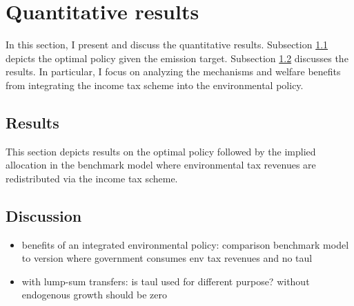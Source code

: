 \section{Quantitative results}\label{sec:res}

In this section, I present and discuss the quantitative results.
Subsection \ref{subsec:mr} depicts the optimal policy given the emission target. Subsection \ref{subsec:dis} discusses the results. In particular, I focus on analyzing the mechanisms and welfare benefits from integrating the income tax scheme into the environmental policy. 
\subsection{Results}\label{subsec:mr}
This section depicts results on the optimal policy followed by the implied allocation in the benchmark model where environmental tax revenues are redistributed via the income tax scheme. 


\subsection{Discussion}\label{subsec:dis}
\begin{itemize}
	\item benefits of an integrated environmental policy: comparison benchmark model to version where government consumes env tax revenues and no taul
	\item with lump-sum transfers: is taul used for different purpose? without endogenous growth should be zero
\end{itemize}

